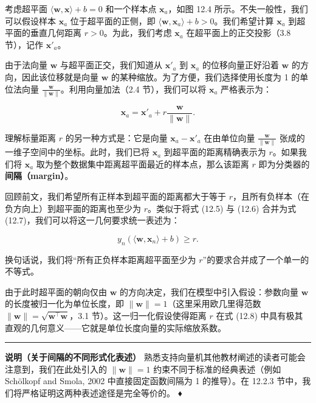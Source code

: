 考虑超平面 $ \langle \boldsymbol{w}, \boldsymbol{x} \rangle + b = 0 $ 和一个样本点 $ \boldsymbol{x}_a $，如图 12.4 所示。不失一般性，我们可以假设样本 $ \boldsymbol{x}_a $ 位于超平面的正侧，即 $ \langle \boldsymbol{w}, \boldsymbol{x}_a \rangle + b > 0 $。我们希望计算 $ \boldsymbol{x}_a $ 到超平面的垂直几何距离 $ r > 0 $。为此，我们考虑 $ \boldsymbol{x}_a $ 在超平面上的正交投影（3.8 节），记作 $ \boldsymbol{x}'_a $。

由于法向量 $ \boldsymbol{w} $ 与超平面正交，我们知道从 $ \boldsymbol{x}'_a $ 到 $ \boldsymbol{x}_a $ 的位移向量正好沿着 $ \boldsymbol{w} $ 的方向，因此该位移就是向量 $ \boldsymbol{w} $ 的某种缩放。为了方便，我们选择使用长度为 1 的单位法向量 $ \frac{\boldsymbol{w}}{\|\boldsymbol{w}\|} $。利用向量加法（2.4 节），我们可以将 $ \boldsymbol{x}_a $ 严格表示为：

\begin{equation}
\boldsymbol{x}_a = \boldsymbol{x}'_a + r \frac{\boldsymbol{w}}{\|\boldsymbol{w}\|} .
\tag{12.8}
\end{equation}

理解标量距离 $ r $ 的另一种方式是：它是向量 $ \boldsymbol{x}_a - \boldsymbol{x}'_a $ 在由单位向量 $ \frac{\boldsymbol{w}}{\|\boldsymbol{w}\|} $ 张成的一维子空间中的坐标。此时，我们已将 $ \boldsymbol{x}_a $ 到超平面的距离精确表示为 $ r $。如果我们将 $ \boldsymbol{x}_a $ 取为整个数据集中距离超平面最近的样本点，那么该距离 $ r $ 即为分类器的 \textbf{间隔（margin）}。

回顾前文，我们希望所有正样本到超平面的距离都大于等于 $ r $，且所有负样本（在负方向上）到超平面的距离也至少为 $ r $。类似于将式 (12.5) 与 (12.6) 合并为式 (12.7)，我们可以将这一几何要求统一表述为：

\begin{equation}
y_n (\langle \boldsymbol{w}, \boldsymbol{x}_n \rangle + b) \geqslant r .
\tag{12.9}
\end{equation}

换句话说，我们将“所有正负样本距离超平面至少为 $ r $”的要求合并成了一个单一的不等式。

由于此时超平面的朝向仅由 $ \boldsymbol{w} $ 的方向决定，我们在模型中引入假设：参数向量 $ \boldsymbol{w} $ 的长度被归一化为单位长度，即 $ \|\boldsymbol{w}\| = 1 $（这里采用欧几里得范数 $ \|\boldsymbol{w}\| = \sqrt{\boldsymbol{w}^\top \boldsymbol{w}} $，3.1 节）。这一归一化假设使得距离 $ r $ 在式 (12.8) 中具有极其直观的几何意义——它就是单位长度向量的实际缩放系数。

\medskip\hrule\medskip

\textbf{说明（关于间隔的不同形式化表述）} 熟悉支持向量机其他教材阐述的读者可能会注意到，我们在此处引入的 $ \|\boldsymbol{w}\| = 1 $ 约束不同于标准的经典表述（例如 Schölkopf and Smola, 2002 中直接固定函数间隔为 1 的推导）。在 12.2.3 节中，我们将严格证明这两种表述途径是完全等价的。 ♦

